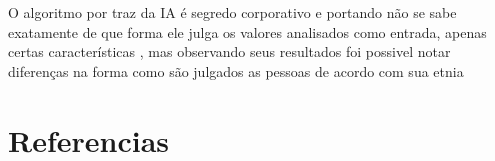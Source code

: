 \documentclass[11pt,twocolumn]{article}
\begin{document}
O algoritmo por traz da IA é segredo corporativo e portando não se sabe exatamente de que forma ele julga os valores analisados como entrada,
apenas certas características , mas observando seus resultados foi possivel notar diferenças na forma como são julgados as pessoas de acordo 
com sua etnia 


\section{Referencias}


%
\end{document}
